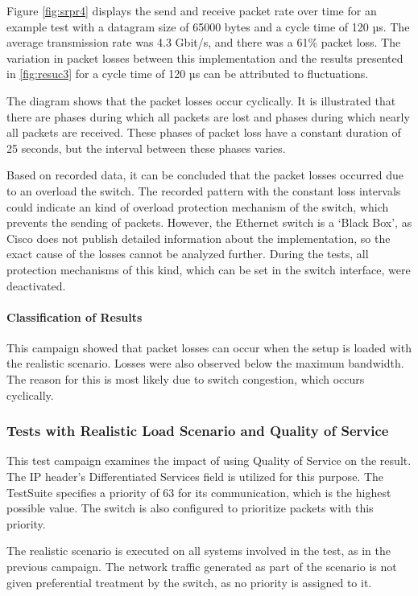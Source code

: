 Figure \ref{fig:srpr4} displays the send and receive packet rate over time for an example test with a datagram size of 65000 bytes and a cycle time of 120 µs. The average transmission rate was 4.3 Gbit/s, and there was a 61\% packet loss. The variation in packet losses between this implementation and the results presented in \ref{fig:resuc3} for a cycle time of 120 µs can be attributed to fluctuations.

The diagram shows that the packet losses occur cyclically. It is illustrated that there are phases during which all packets are lost and phases during which nearly all packets are received. These phases of packet loss have a constant duration of 25 seconds, but the interval between these phases varies.

Based on recorded data, it can be concluded that the packet losses occurred due to an overload the switch. The recorded pattern with the constant loss intervals could indicate an kind of overload protection mechanism of the switch, which prevents the sending of packets. However, the Ethernet switch is a `Black Box', as Cisco does not publish detailed information about the implementation, so the exact cause of the losses cannot be analyzed further. During the tests, all protection mechanisms of this kind, which can be set in the switch interface, were deactivated.

\paragraph{Classification of Results}
This campaign showed that packet losses can occur when the setup is loaded with the realistic scenario. Losses were also observed below the maximum bandwidth. The reason for this is most likely due to switch congestion, which occurs cyclically.

\subsubsection{Tests with Realistic Load Scenario and Quality of Service}
This test campaign examines the impact of using Quality of Service on the result. The IP header's Differentiated Services field is utilized for this purpose. The TestSuite specifies a priority of 63 for its communication, which is the highest possible value. The switch is also configured to prioritize packets with this priority.

The realistic scenario is executed on all systems involved in the test, as in the previous campaign. The network traffic generated as part of the scenario is not given preferential treatment by the switch, as no priority is assigned to it.

